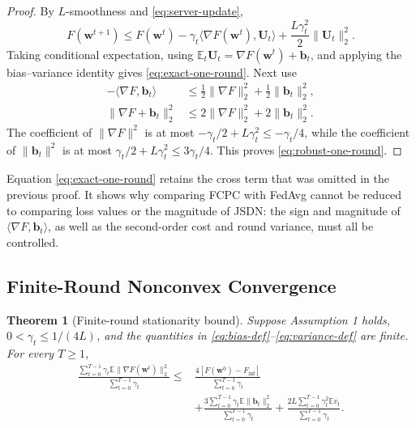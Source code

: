 \documentclass[journal,twoside,web]{ieeecolor}
\newtheorem{theorem}{Theorem}
\begin{document}
\begin{proof}
By $L$-smoothness and \eqref{eq:server-update},
\begin{equation}
 F(\bm w^{t+1})
 \leq F(\bm w^t)-\gamma_t\langle\nabla F(\bm w^t),\bm U_t\rangle
 +\frac{L\gamma_t^2}{2}\|\bm U_t\|_2^2.
\end{equation}
Taking conditional expectation, using
$\mathbb E_t\bm U_t=\nabla F(\bm w^t)+\bm b_t$, and applying the
bias--variance identity gives \eqref{eq:exact-one-round}. Next use
\begin{align}
 -\langle\nabla F,\bm b_t\rangle
 &\leq\frac12\|\nabla F\|_2^2+\frac12\|\bm b_t\|_2^2,\\
 \|\nabla F+\bm b_t\|_2^2
 &\leq2\|\nabla F\|_2^2+2\|\bm b_t\|_2^2.
\end{align}
The coefficient of $\|\nabla F\|^2$ is at most
$-\gamma_t/2+L\gamma_t^2\leq-\gamma_t/4$, while the coefficient of
$\|\bm b_t\|^2$ is at most
$\gamma_t/2+L\gamma_t^2\leq3\gamma_t/4$. This proves
\eqref{eq:robust-one-round}.
\end{proof}

Equation \eqref{eq:exact-one-round} retains the cross term that was omitted in
the previous proof. It shows why comparing FCPC with FedAvg cannot be reduced
to comparing loss values or the magnitude of JSDN: the sign and magnitude of
$\langle\nabla F,\bm b_t\rangle$, as well as the second-order cost and round
variance, must all be controlled.

\subsection{Finite-Round Nonconvex Convergence}

\begin{theorem}[Finite-round stationarity bound]                          \label{thm:finite-round}
Suppose Assumption 1 holds, $0<\gamma_t\leq1/(4L)$, and the quantities in
\eqref{eq:bias-def}--\eqref{eq:variance-def} are finite. For every $T\geq1$,
\begin{align}
 \frac{\sum_{t=0}^{T-1}\gamma_t
 \mathbb E\|\nabla F(\bm w^t)\|_2^2}
 {\sum_{t=0}^{T-1}\gamma_t}
 \leq{}&
 \frac{4\left[F(\bm w^0)-F_{\inf}\right]}
 {\sum_{t=0}^{T-1}\gamma_t} \nonumber\\
 &+\frac{3\sum_{t=0}^{T-1}\gamma_t
 \mathbb E\|\bm b_t\|_2^2}
 {\sum_{t=0}^{T-1}\gamma_t}
 +\frac{2L\sum_{t=0}^{T-1}\gamma_t^2\mathbb E v_t}
 {\sum_{t=0}^{T-1}\gamma_t}.                           \label{eq:finite-round-bound}
\end{align}
\end{theorem}
\end{document}
